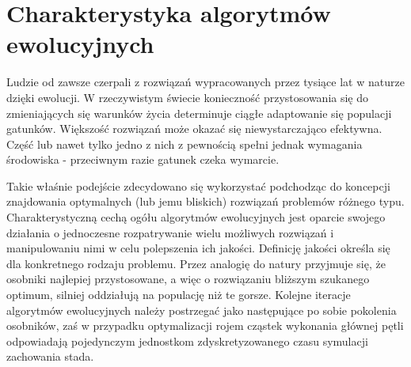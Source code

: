 \chapter{Charakterystyka algorytmów ewolucyjnych}
\label{ch:charakterystyka_algorytmow_ewolucyjnych}
\par
Ludzie od zawsze czerpali z rozwiązań wypracowanych przez tysiące lat w naturze dzięki ewolucji. W rzeczywistym świecie konieczność przystosowania się do zmieniających się warunków życia determinuje ciągłe adaptowanie się populacji gatunków. Większość rozwiązań może okazać się niewystarczająco efektywna. Część lub nawet tylko jedno z nich z pewnością spełni jednak wymagania środowiska - przeciwnym razie gatunek czeka wymarcie. 
\par
Takie właśnie podejście zdecydowano się wykorzystać podchodząc do koncepcji znajdowania optymalnych (lub jemu bliskich) rozwiązań problemów różnego typu. Charakterystyczną cechą ogółu algorytmów ewolucyjnych jest oparcie swojego działania o jednoczesne rozpatrywanie wielu możliwych rozwiązań i manipulowaniu nimi w celu polepszenia ich jakości. Definicję jakości określa się dla konkretnego rodzaju problemu. Przez analogię do natury przyjmuje się, że osobniki najlepiej przystosowane, a więc o rozwiązaniu bliższym szukanego optimum, silniej oddziałują na populację niż te gorsze. Kolejne iteracje algorytmów ewolucyjnych należy postrzegać jako następujące po sobie pokolenia osobników, zaś w przypadku optymalizacji rojem cząstek wykonania głównej pętli odpowiadają pojedynczym jednostkom zdyskretyzowanego czasu symulacji zachowania stada. 

